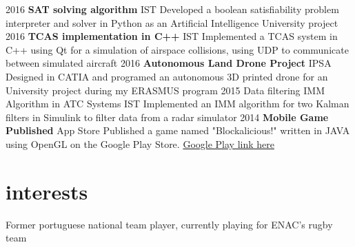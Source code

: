 \documentclass[a4paper]{friggeri-cv} %
\begin{document}
\begin{entrylist}

\entry
{2016}
{\textbf{SAT solving algorithm}}
{IST}
{Developed a boolean satisfiability problem interpreter and solver in Python as an Artificial Intelligence University project}
\entry
{2016}
{\textbf{TCAS implementation in C++}}
{IST}
{Implemented a TCAS system in C++ using Qt for a simulation of airspace collisions, using UDP to communicate between simulated aircraft}
\entry
{2016}
{\textbf{Autonomous Land Drone Project}}
{IPSA}
{Designed in CATIA and programed an autonomous 3D printed drone for an University project during my ERASMUS program}
\entry
{2015}
{Data filtering IMM Algorithm in ATC Systems}
{IST}
{Implemented an IMM algorithm for two Kalman filters in Simulink to filter data from a radar simulator}
\entry
{2014}
{\textbf{Mobile Game Published}}
{App Store}
{Published a game named "Blockalicious!" written in JAVA using OpenGL on the Google Play Store. 
\href{https://play.google.com/store/apps/details?id=com.guiero.blockaliciousfinal}{Google Play link here}}




\end{entrylist}


%


\section{interests}

Former portuguese national team player, currently playing for ENAC's rugby team 

\end{document}
